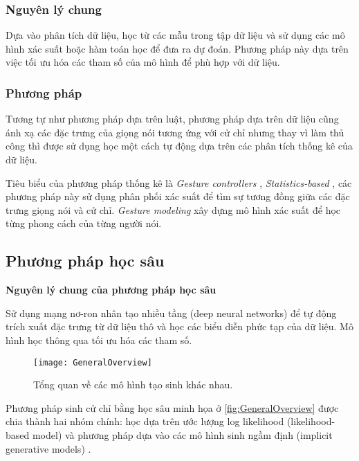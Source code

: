 \subsubsection{Nguyên lý chung}

Dựa vào phân tích dữ liệu, học từ các mẫu trong tập dữ liệu và sử dụng các mô hình xác suất hoặc hàm toán học để đưa ra dự đoán. Phương pháp này dựa trên việc tối ưu hóa các tham số của mô hình để phù hợp với dữ liệu.

\subsubsection{Phương pháp}

Tương tự như phương pháp dựa trên luật, phương pháp dựa trên dữ liệu cũng ánh xạ các đặc trưng của giọng nói tương ứng với cử chỉ nhưng thay vì làm thủ công thì được sử dụng học một cách tự động dựa trên các phân tích thống kê của dữ liệu.

Tiêu biểu của phương pháp thống kê là \textit{Gesture controllers} \cite{levine2010gesture}, \textit{Statistics-based} \cite{yang2020statistics}, các phương pháp này sử dụng phân phối xác suất để tìm sự tương đồng giữa các đặc trưng giọng nói và cử chỉ. \textit{Gesture modeling}  \cite{neff2008gesture} xây dựng mô hình xác suất để học từng phong cách của từng người nói.

\subsection{Phương pháp học sâu}

\textbf{Nguyên lý chung của phương pháp học sâu}

Sử dụng mạng nơ-ron nhân tạo nhiều tầng (deep neural networks) để tự động trích xuất đặc trưng từ dữ liệu thô và học các biểu diễn phức tạp của dữ liệu. Mô hình học thông qua tối ưu hóa các tham số.

\begin{figure}[H]
	\centering
	\texttt{[image: GeneralOverview]}
	\caption{Tổng quan về các mô hình tạo sinh khác nhau.}
	\label{fig:GeneralOverview}
\end{figure}

Phương pháp sinh cử chỉ bằng học sâu minh họa  ở \autoref{fig:GeneralOverview} được chia thành hai nhóm chính: học dựa trên ước lượng log likelihood (likelihood-based model)  và phương pháp dựa vào các mô hình sinh ngầm định (implicit generative models) \cite{song2021score}.

